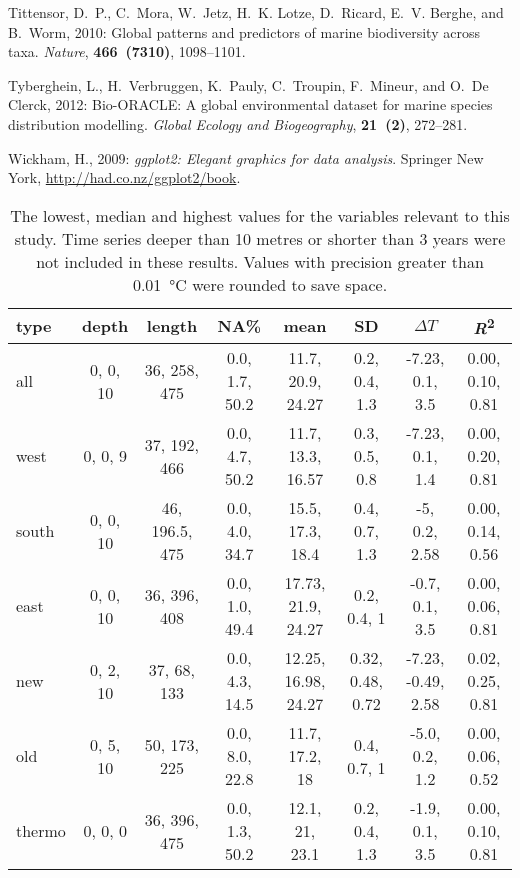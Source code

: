 \documentclass{ametsoc}
\begin{document}
\begin{thebibliography}{23}
Tittensor, D.~P., C.~Mora, W.~Jetz, H.~K. Lotze, D.~Ricard, E.~V. Berghe, and
  B.~Worm, 2010: {Global patterns and predictors of marine biodiversity across
  taxa}. \textit{Nature}, \textbf{466~(7310)}, 1098--1101.

Tyberghein, L., H.~Verbruggen, K.~Pauly, C.~Troupin, F.~Mineur, and O.~{De
  Clerck}, 2012: {Bio-ORACLE: A global environmental dataset for marine species
  distribution modelling}. \textit{Global Ecology and Biogeography},
  \textbf{21~(2)}, 272--281.

Wickham, H., 2009: \textit{ggplot2: Elegant graphics for data analysis}.
  Springer New York, \urlprefix\url{http://had.co.nz/ggplot2/book}.

\end{thebibliography}

%
\begin{table}[ht]
\caption{\small The lowest, median and highest values for the variables relevant to this study. Time series deeper than 10 metres or shorter than 3 years were not included in these results. Values with precision greater than \SI{0.01}{\degreeCelsius} were rounded to save space.}
\label{range-table}
\centering
\tiny
\begin{tabular}{lccccccc}
\hline
 type & depth & length & NA\% & mean & SD & $\Delta T$ & \emph{R}\textsuperscript{2} \\
 \hline
  all & 0, 0, 10 & 36, 258, 475 & 0.0, 1.7, 50.2 & 11.7, 20.9, 24.27 & 0.2, 0.4, 1.3 & -7.23, 0.1, 3.5 & 0.00, 0.10, 0.81 \\
  west & 0, 0, 9 & 37, 192, 466 & 0.0, 4.7, 50.2 & 11.7, 13.3, 16.57 & 0.3, 0.5, 0.8 & -7.23, 0.1, 1.4 & 0.00, 0.20, 0.81 \\
  south & 0, 0, 10 & 46, 196.5, 475 & 0.0, 4.0, 34.7 & 15.5, 17.3, 18.4 & 0.4, 0.7, 1.3 & -5, 0.2, 2.58 & 0.00, 0.14, 0.56 \\
  east & 0, 0, 10 & 36, 396, 408 & 0.0, 1.0, 49.4 & 17.73, 21.9, 24.27 & 0.2, 0.4, 1 & -0.7, 0.1, 3.5 & 0.00, 0.06, 0.81 \\
  new & 0, 2, 10 & 37, 68, 133 & 0.0, 4.3, 14.5 & 12.25, 16.98, 24.27 & 0.32, 0.48, 0.72 & -7.23, -0.49, 2.58 & 0.02, 0.25, 0.81 \\
  old & 0, 5, 10 & 50, 173, 225 & 0.0, 8.0, 22.8 & 11.7, 17.2, 18 & 0.4, 0.7, 1 & -5.0, 0.2, 1.2 & 0.00, 0.06, 0.52 \\
  thermo & 0, 0, 0 & 36, 396, 475 & 0.0, 1.3, 50.2 & 12.1, 21, 23.1 & 0.2, 0.4, 1.3 & -1.9, 0.1, 3.5 & 0.00, 0.10, 0.81 \\
  \hline
  \end{tabular}
\end{table}
\end{document}
